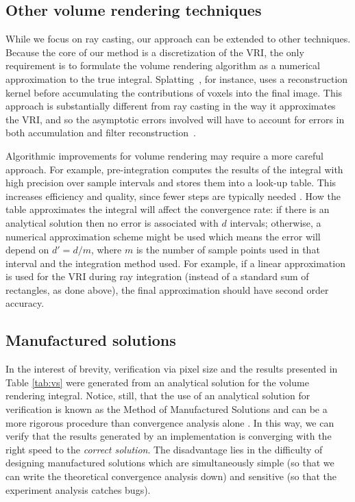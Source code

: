 \subsection{Other volume rendering techniques}

While we focus on ray casting, our approach can be extended to other
techniques. Because the core of our method is a discretization of the
VRI, the only requirement is to formulate the volume rendering
algorithm as a numerical approximation to the true integral.
Splatting~\cite{Westover:1989:IVR:329129.329138}, for instance, uses a
reconstruction kernel before accumulating the contributions of voxels
into the final image. This approach is substantially different from
ray casting in the way it approximates the VRI, and so the asymptotic
errors involved will have to account for errors in both accumulation
and filter reconstruction~\cite{Moller:1996:CLE:236226.236235}.

Algorithmic improvements for volume rendering may require a more
careful approach. For example, pre-integration computes the results of
the integral with high precision over sample intervals and stores them
into a look-up table. This increases efficiency and quality, since
fewer steps are typically needed \cite{Engel01}. How the table
approximates the integral will affect the convergence rate: if there
is an analytical solution then no error is associated with $d$
intervals; otherwise, a numerical approximation scheme might be used
which means the error will depend on $d' = d / m$, where $m$ is the
number of sample points used in that interval and the integration
method used. For example, if a linear approximation is used for the
VRI during ray integration (instead of a standard sum of rectangles,
as done above), the final approximation should have second order
accuracy.

\subsection{Manufactured solutions}
%
In the interest of brevity, verification via pixel size and the
results presented in Table \ref{tab:vs} were generated from an
analytical solution for the volume rendering integral. Notice, still,
that the use of an analytical solution for verification is known as
the Method of Manufactured Solutions \cite{babuska04} and can be a
more rigorous procedure than convergence analysis alone
\cite{Roy2005}. In this way, we can verify that the results generated
by an implementation is converging with the right speed to the
\emph{correct solution}. The disadvantage lies in the difficulty of
designing manufactured solutions which are simultaneously simple (so
that we can write the theoretical convergence analysis down) and
sensitive (so that the experiment analysis catches bugs).

